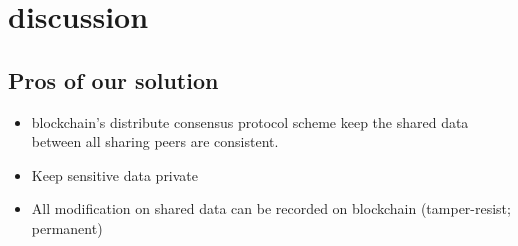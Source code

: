 \documentclass[conference]{IEEEtran}
\begin{document}
%
%
%
%
%
%
%
%
%


\section{discussion}

\subsection{Pros of our solution}
\begin{itemize}
	\item blockchain's distribute consensus protocol scheme keep the shared data between all sharing peers are consistent.
	
	\item Keep sensitive data private 
	
	\item All modification on shared data can be recorded on blockchain (tamper-resist; permanent)
\end{itemize}
\end{document}
